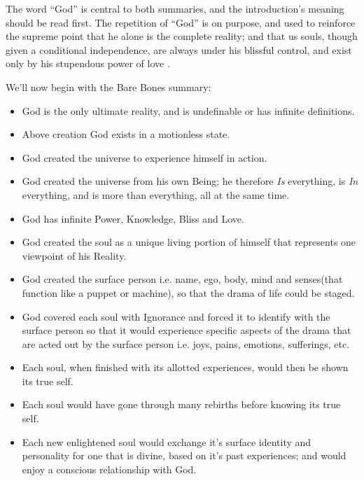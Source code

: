 \documentclass[12pt,a4paper]{book}
\begin{document}
The word ``God'' is central to both summaries, and the introduction's
meaning should be read first. The repetition of ``God'' is on purpose,
and used to reinforce the supreme point that he alone is the complete
reality; and that us souls, though given a conditional independence,
are always under his blissful control, and exist only by his
stupendous power of love .

\noindent We'll now begin with the Bare Bones summary:

\begin{itemize}
\renewcommand{\labelitemi}{$\diamond$}
\item God is the only ultimate reality, and is undefinable or has
  infinite definitions.

\item Above creation God exists in a motionless state.

\item God created the universe to experience himself in action.

\item God created the universe from his own Being; he therefore
  \emph{Is} everything, is \emph{In} everything, and is more than everything,
  all at the same time.

\item God has infinite Power, Knowledge, Bliss and Love.

\item God created the soul as a unique living portion of himself that
  represents one viewpoint of his Reality.

\item God created the surface person i.e. name, ego, body, mind and
  senses(that function like a puppet or machine), so that the drama of
  life could be staged.

\item God covered each soul with Ignorance and forced it to identify
  with the surface person so that it would experience specific aspects
  of the drama that are acted out by the surface person i.e. joys,
  pains, emotions, sufferings, etc.

\item Each soul, when finished with its allotted experiences, would
  then be shown its true self.

\item Each soul would have gone through many rebirths before knowing
  its true self.

\item Each new enlightened soul would exchange it's surface identity
  and personality for one that is divine, based on it's past
  experiences; and would enjoy a conscious relationship with God.


\end{itemize}
\end{document}
